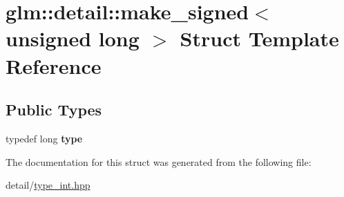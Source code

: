 \hypertarget{structglm_1_1detail_1_1make__signed_3_01unsigned_01long_01_4}{\section{glm\-:\-:detail\-:\-:make\-\_\-signed$<$ unsigned long $>$ Struct Template Reference}
\label{structglm_1_1detail_1_1make__signed_3_01unsigned_01long_01_4}
}
\subsection*{Public Types}
\begin{DoxyCompactItemize}
\item 
\hypertarget{structglm_1_1detail_1_1make__signed_3_01unsigned_01long_01_4_a055abdf7ba75d133a9784c2749f2336f}{typedef long {\bfseries type}}\label{structglm_1_1detail_1_1make__signed_3_01unsigned_01long_01_4_a055abdf7ba75d133a9784c2749f2336f}

\end{DoxyCompactItemize}


The documentation for this struct was generated from the following file\-:\begin{DoxyCompactItemize}
\item 
detail/\hyperlink{type__int_8hpp}{type\-\_\-int.\-hpp}\end{DoxyCompactItemize}
